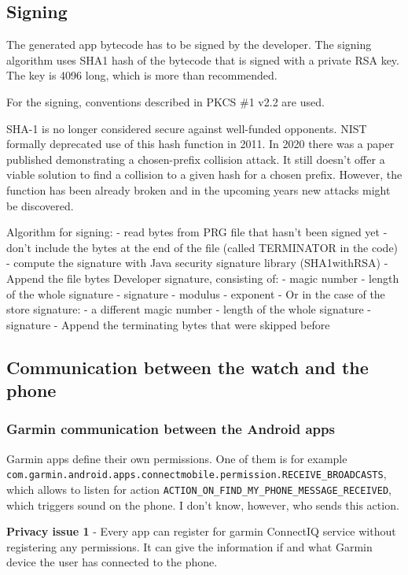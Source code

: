 \subsection{Signing}
The generated app bytecode has to be signed by the developer.
The signing algorithm uses SHA1 hash of the bytecode that is signed with a private RSA key.
The key is 4096 long, which is more than recommended.

For the signing, conventions described in PKCS \#1 v2.2 are used.

SHA-1 is no longer considered secure against well-funded opponents.
NIST formally deprecated use of this hash function in 2011.
In 2020 there was a paper published demonstrating a chosen-prefix collision attack.
It still doesn't offer a viable solution to find a collision to a given hash for a chosen prefix.
However, the function has been already broken and in the upcoming years new attacks might be discovered.

Algorithm for signing:
- read bytes from PRG file that hasn't been signed yet
- don't include the bytes at the end of the file (called TERMINATOR in the code)
- compute the signature with Java security signature library (SHA1withRSA)
- Append the file bytes Developer signature, consisting of:
- magic number
- length of the whole signature
- signature
- modulus
- exponent
- Or in the case of the store signature:
- a different magic number
- length of the whole signature
- signature
- Append the terminating bytes that were skipped before

\subsection{Communication between the watch and the phone}

\subsubsection{Garmin communication between the Android apps}
Garmin apps define their own permissions.
One of them is for example \verb|com.garmin.android.apps.connectmobile.permission.RECEIVE_BROADCASTS|, which allows to listen for action \verb|ACTION_ON_FIND_MY_PHONE_MESSAGE_RECEIVED|, which triggers sound on the phone.
I don't know, however, who sends this action.

\textbf{Privacy issue 1} - Every app can register for garmin ConnectIQ service without registering any permissions.
It can give the information if and what Garmin device the user has connected to the phone.

